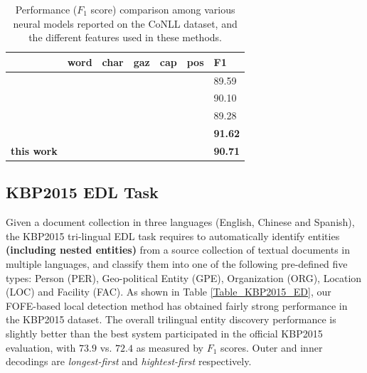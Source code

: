 \documentclass[11pt,a4paper]{article}
\newcommand{\cmark}{\ding{51}}
\newcommand{\xmark}{\ding{55}}
\begin{document}
\begin{table}[h!]
	\centering
	\begin{tabular}{|l|lllll|l|}
		\hline
		& word & char & gaz & cap & pos & F1 \\
		\hline\hline
		\cite{collobert2011natural} & \cmark & \xmark & \cmark & \cmark & \xmark & 89.59  \\
		\cite{huang2015bidirectional} &\cmark & \cmark & \cmark & \cmark & \cmark & 90.10 \\
		\cite{rondeau2016lstm}  & \cmark & \xmark & \cmark & \cmark & \cmark & 89.28 \\
		\cite{chiu2016named} & \cmark & \cmark & \cmark & \xmark & \xmark & {\bf 91.62} \\
		\hline \hline
		{\bf this work} & \cmark & \cmark & \xmark & \xmark & \xmark & {\bf 90.71} \\
		\hline
	\end{tabular}
	\caption{Performance ($F_1$ score) comparison among various neural models reported on the CoNLL dataset, and the different features used in these methods.}
	\label{tbl:nn-cmp:CoNLL03}
\end{table}


\subsection{KBP2015 EDL Task}

Given a document collection in three languages (English, Chinese and Spanish), the KBP2015 tri-lingual EDL task \cite{kbpoverview2015} requires to automatically identify entities \textbf{(including nested entities)}  from a
source collection of textual documents in multiple
languages, and classify them into one of the following pre-defined
five types: Person (PER), Geo-political Entity
(GPE), Organization (ORG), Location (LOC)
and Facility (FAC).
As shown in Table \ref{Table_KBP2015_ED}, our FOFE-based local detection method has obtained fairly strong performance in the KBP2015 dataset. The overall trilingual entity discovery performance is slightly better than the best system participated in the official KBP2015 evaluation, with $73.9$ vs. $72.4$ as measured by $F_1$ scores. Outer and inner decodings are {\it longest-first} and {\it hightest-first} respectively.
\end{document}
